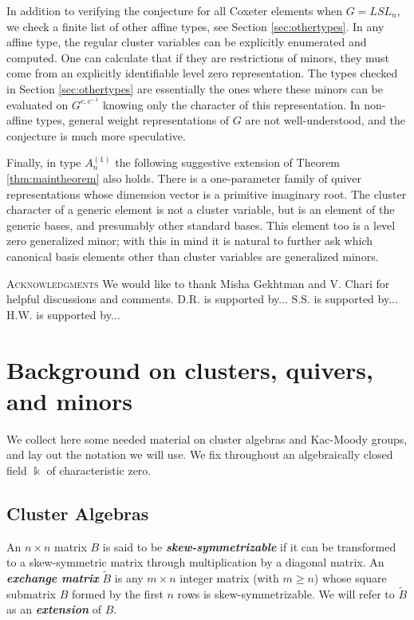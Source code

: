 \documentclass[12pt]{amsart}
\newcommand{\newword}[1]{\textbf{\emph{#1}}}
\newcommand{\kk}{\Bbbk}%
\theoremstyle{remark}
\numberwithin{equation}{section}
\begin{document}
In addition to verifying the conjecture for all Coxeter elements when $G = LSL_n$, we check a finite list of other affine types, see Section \ref{sec:othertypes}. In any affine type, the regular cluster variables can be explicitly enumerated and computed. One can calculate that if they are restrictions of minors, they must come from an explicitly identifiable level zero representation. The types checked in Section \ref{sec:othertypes} are essentially the ones where these minors can be evaluated on $G^{c,c^{-1}}$ knowing only the character of this representation. In non-affine types, general weight representations of $G$ are not well-understood, and the conjecture is much more speculative.

Finally, in type $A_n^{(1)}$ the following suggestive extension of Theorem \ref{thm:maintheorem} also holds. There is a one-parameter family of quiver representations whose dimension vector is a primitive imaginary root. The cluster character of a generic element is not a cluster variable, but is an element of the generic bases, and presumably other standard bases. This element too is a level zero generalized minor; with this in mind it is natural to further ask which canonical basis elements other than cluster variables are generalized minors.

\textsc{Acknowledgments}  We would like to thank Misha Gekhtman and V. Chari for helpful discussions and comments. D.R. is supported by... S.S. is supported by... H.W. is supported by...

\section{Background on clusters, quivers, and minors}

We collect here some needed material on cluster algebras and Kac-Moody groups, and lay out the notation we will use.  
We fix throughout an algebraically closed field $\kk$ of characteristic zero. 

\subsection{Cluster Algebras}
An $n\times n$ matrix $B$ is said to be \newword{skew-symmetrizable} if it can be transformed to a skew-symmetric matrix through multiplication by a diagonal matrix.
An \newword{exchange matrix} $\widetilde B$ is any $m\times n$ integer matrix (with $m\geq n$)  whose square submatrix $B$ formed by the first $n$ rows is skew-symmetrizable.
We will refer to $\widetilde B$ as an \newword{extension} of $B$.
\end{document}
